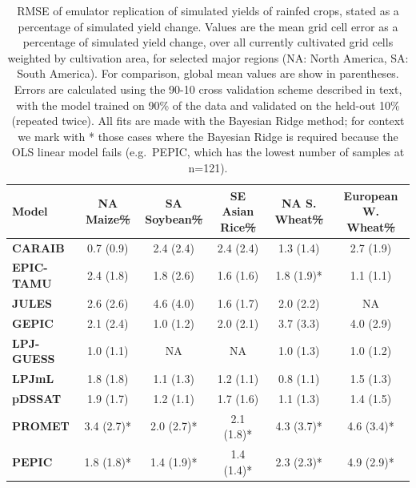 \documentclass[gmdd]{copernicus} %
\providecommand{\DIFdel}[1]{{\protect\color{red}\sout{#1}}}                      %
\providecommand{\DIFdelFL}[1]{\DIFdel{#1}} %
\providecommand{\DIFdelbeginFL}{} %
\providecommand{\DIFdelendFL}{} %
\begin{document}
\begin{table}[ht]
    \caption{
    RMSE of emulator replication of simulated yields of rainfed crops, stated as a percentage of simulated yield change.
    Values are the mean grid cell error as a percentage of simulated yield change, over all currently cultivated grid cells weighted by cultivation area, for selected major regions (NA: North America, SA: South America). For comparison, global mean values are show in parentheses. 
    Errors are calculated using the 90-10 cross validation scheme described in text, with the model trained on 90\% of the data and validated on the held-out 10\% (repeated twice). All fits are made with the Bayesian Ridge method; 
    for context we mark with * those cases where the Bayesian Ridge is required because the OLS linear model fails (e.g.\ PEPIC, which has the lowest number of samples at n=121).
    } 
    \label{table:ASE}
    \begin{tabular}{l | c | c | c | c | c} 
        \hline
        \textbf{Model} & \textbf{NA Maize\DIFdelbeginFL \DIFdelFL{\%}\DIFdelendFL } & \textbf{SA Soybean\DIFdelbeginFL \DIFdelFL{\%}\DIFdelendFL } & \textbf{SE Asian Rice\DIFdelbeginFL \DIFdelFL{\%}\DIFdelendFL } & \textbf{NA S. Wheat\DIFdelbeginFL \DIFdelFL{\%}\DIFdelendFL } &\textbf{European W. Wheat\DIFdelbeginFL \DIFdelFL{\%}\DIFdelendFL } \\ \hline
        \textbf{CARAIB}    & 0.7 (0.9)  & 2.4 (2.4)  & 2.4 (2.4)  & 1.3 (1.4)  & 2.7 (1.9)  \\ \hline
        \textbf{EPIC-TAMU} & 2.4 (1.8)  & 1.8 (2.6)  & 1.6 (1.6)  & 1.8 (1.9)* & 1.1 (1.1)  \\ \hline
        \textbf{JULES}     & 2.6 (2.6)  & 4.6 (4.0)  & 1.6 (1.7)  & 2.0 (2.2)  & NA         \\ \hline
        \textbf{GEPIC}     & 2.1 (2.4)  & 1.0 (1.2)  & 2.0 (2.1)  & 3.7 (3.3)  & 4.0 (2.9)  \\ \hline
        \textbf{LPJ-GUESS} & 1.0 (1.1)  & NA         & NA         & 1.0 (1.3)  & 1.0 (1.2)  \\ \hline
        \textbf{LPJmL}     & 1.8 (1.8)  & 1.1 (1.3)  & 1.2 (1.1)  & 0.8 (1.1)  & 1.5 (1.3)  \\ \hline
        \textbf{pDSSAT}    & 1.9 (1.7)  & 1.2 (1.1)  & 1.7 (1.6)  & 1.1 (1.3)  & 1.4 (1.5)  \\ \hline
        \textbf{PROMET}    & 3.4 (2.7)* & 2.0 (2.7)* & 2.1 (1.8)* & 4.3 (3.7)* & 4.6 (3.4)* \\ \hline
        \textbf{PEPIC}     & 1.8 (1.8)* & 1.4 (1.9)* & 1.4 (1.4)* & 2.3 (2.3)* & 4.9 (2.9)* \\ \hline
    \end{tabular}
\end{table}
\end{document}
